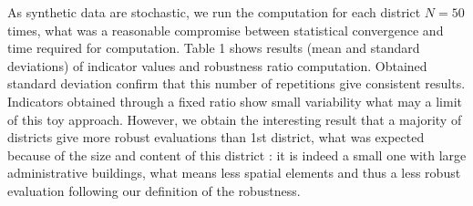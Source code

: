 \documentclass[runningheads,a4paper]{llncs2e/llncs}
\begin{document}
As synthetic data are stochastic, we run the computation for each district $N=50$ times, what was a reasonable compromise between statistical convergence and time required for computation. Table 1 shows results (mean and standard deviations) of indicator values and robustness ratio computation. Obtained standard deviation confirm that this number of repetitions give consistent results. Indicators obtained through a fixed ratio show small variability what may a limit of this toy approach. However, we obtain the interesting result that a majority of districts give more robust evaluations than 1st district, what was expected because of the size and content of this district : it is indeed a small one with large administrative buildings, what means less spatial elements and thus a less robust evaluation following our definition of the robustness.






\end{document}
